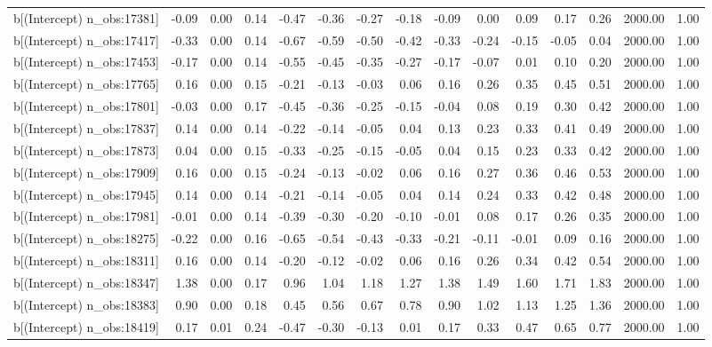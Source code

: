 \begin{table}[ht]
\begin{tabular}{rrrrrrrrrrrrrrr}
  b[(Intercept) n\_obs:17381] & -0.09 & 0.00 & 0.14 & -0.47 & -0.36 & -0.27 & -0.18 & -0.09 & 0.00 & 0.09 & 0.17 & 0.26 & 2000.00 & 1.00 \\ 
  b[(Intercept) n\_obs:17417] & -0.33 & 0.00 & 0.14 & -0.67 & -0.59 & -0.50 & -0.42 & -0.33 & -0.24 & -0.15 & -0.05 & 0.04 & 2000.00 & 1.00 \\ 
  b[(Intercept) n\_obs:17453] & -0.17 & 0.00 & 0.14 & -0.55 & -0.45 & -0.35 & -0.27 & -0.17 & -0.07 & 0.01 & 0.10 & 0.20 & 2000.00 & 1.00 \\ 
  b[(Intercept) n\_obs:17765] & 0.16 & 0.00 & 0.15 & -0.21 & -0.13 & -0.03 & 0.06 & 0.16 & 0.26 & 0.35 & 0.45 & 0.51 & 2000.00 & 1.00 \\ 
  b[(Intercept) n\_obs:17801] & -0.03 & 0.00 & 0.17 & -0.45 & -0.36 & -0.25 & -0.15 & -0.04 & 0.08 & 0.19 & 0.30 & 0.42 & 2000.00 & 1.00 \\ 
  b[(Intercept) n\_obs:17837] & 0.14 & 0.00 & 0.14 & -0.22 & -0.14 & -0.05 & 0.04 & 0.13 & 0.23 & 0.33 & 0.41 & 0.49 & 2000.00 & 1.00 \\ 
  b[(Intercept) n\_obs:17873] & 0.04 & 0.00 & 0.15 & -0.33 & -0.25 & -0.15 & -0.05 & 0.04 & 0.15 & 0.23 & 0.33 & 0.42 & 2000.00 & 1.00 \\ 
  b[(Intercept) n\_obs:17909] & 0.16 & 0.00 & 0.15 & -0.24 & -0.13 & -0.02 & 0.06 & 0.16 & 0.27 & 0.36 & 0.46 & 0.53 & 2000.00 & 1.00 \\ 
  b[(Intercept) n\_obs:17945] & 0.14 & 0.00 & 0.14 & -0.21 & -0.14 & -0.05 & 0.04 & 0.14 & 0.24 & 0.33 & 0.42 & 0.48 & 2000.00 & 1.00 \\ 
  b[(Intercept) n\_obs:17981] & -0.01 & 0.00 & 0.14 & -0.39 & -0.30 & -0.20 & -0.10 & -0.01 & 0.08 & 0.17 & 0.26 & 0.35 & 2000.00 & 1.00 \\ 
  b[(Intercept) n\_obs:18275] & -0.22 & 0.00 & 0.16 & -0.65 & -0.54 & -0.43 & -0.33 & -0.21 & -0.11 & -0.01 & 0.09 & 0.16 & 2000.00 & 1.00 \\ 
  b[(Intercept) n\_obs:18311] & 0.16 & 0.00 & 0.14 & -0.20 & -0.12 & -0.02 & 0.06 & 0.16 & 0.26 & 0.34 & 0.42 & 0.54 & 2000.00 & 1.00 \\ 
  b[(Intercept) n\_obs:18347] & 1.38 & 0.00 & 0.17 & 0.96 & 1.04 & 1.18 & 1.27 & 1.38 & 1.49 & 1.60 & 1.71 & 1.83 & 2000.00 & 1.00 \\ 
  b[(Intercept) n\_obs:18383] & 0.90 & 0.00 & 0.18 & 0.45 & 0.56 & 0.67 & 0.78 & 0.90 & 1.02 & 1.13 & 1.25 & 1.36 & 2000.00 & 1.00 \\ 
  b[(Intercept) n\_obs:18419] & 0.17 & 0.01 & 0.24 & -0.47 & -0.30 & -0.13 & 0.01 & 0.17 & 0.33 & 0.47 & 0.65 & 0.77 & 2000.00 & 1.00 \\ 

\end{tabular}
\end{table}
